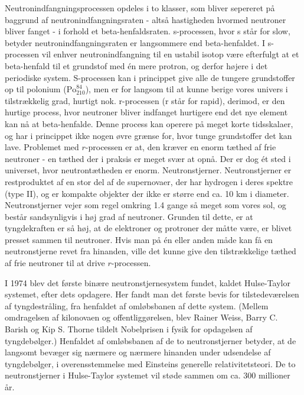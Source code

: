\documentclass[twocolumn]{article}
\begin{document}
Neutronindfangningsprocessen opdeles i to klasser, som bliver sepereret på baggrund af neutronindfangningsraten - altså hastigheden hvormed neutroner bliver fanget - i forhold et beta-henfaldsraten. s-processen, hvor s står for slow, betyder neutronindfangningsraten er langsommere end beta-henfaldet. I s-processen vil enhver neutronindfangning til en ustabil isotop være efterfulgt at et beta-henfald til et grundstof med én mere protron, og derfor højere i det periodiske system. S-processen kan i princippet give alle de tungere grundstoffer op til polonium ($\mathrm{Po}_{210}^{84}$), men er for langsom til at kunne berige vores univers i tilstrækkelig grad, hurtigt nok. r-processen (r står for rapid), derimod, er den hurtige process, hvor neutroner bliver indfanget hurtigere end det nye element kan nå at beta-henfalde. Denne process kan operere på meget korte tidsskalaer, og har i princippet ikke nogen øvre grænse for, hvor tunge grundstoffer det kan lave. Problemet med $r$-processen er at, den kræver en enorm tæthed af frie neutroner - en tæthed der i praksis er meget svær at opnå. Der er dog ét sted i universet, hvor neutrontætheden er enorm. Neutronstjerner. Neutronstjerner er restproduktet af en stor del af de supernovaer, der har hydrogen i deres spektre (type II), og er kompakte objekter der ikke er større end ca. 10 km i diameter. Neutronstjerner vejer som regel omkring 1.4 gange så meget som vores sol, og består sandsynligvis i høj grad af neutroner. Grunden til dette, er at tyngdekraften er så høj, at de elektroner og protroner der måtte være, er blivet presset sammen til neutroner. Hvis man på én eller anden måde kan få en neutronstjerne revet fra hinanden, ville det kunne give den tilstrækkelige tæthed af frie neutroner til at drive $r$-processen.

I 1974 blev det første binære neutronstjernesystem fundet, kaldet Hulse-Taylor systemet, efter dets opdagere. Her fandt man det første bevis for tilstedeværelsen af tyngdestråling, fra henfaldet af omløbsbanen af dette system. (Mellem omdragelsen af kilonovaen og offentliggørelsen, blev Rainer Weiss, Barry C. Barish og Kip S. Thorne tildelt Nobelprisen i fysik for opdagelsen af tyngdebølger.) Henfaldet af omløbsbanen af de to neutronstjerner betyder, at de langsomt bevæger sig nærmere og nærmere hinanden under udsendelse af tyngdebølger, i overensstemmelse med Einsteins generelle relativitetsteori. De to neutronstjerner i Hulse-Taylor systemet vil støde sammen om ca. 300 millioner år.  
\end{document}
